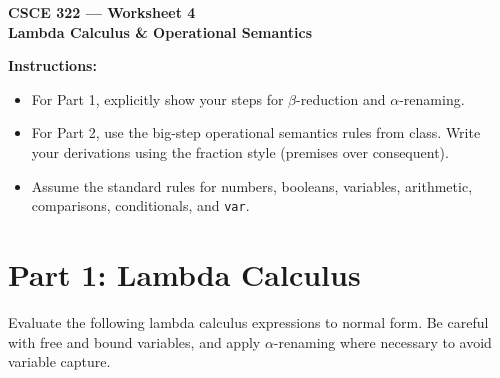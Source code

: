 \documentclass[11pt]{article}
\begin{document}
    \begin{center}
        \Large\textbf{CSCE 322 --- Worksheet 4}\\[2mm]
        \large\textbf{Lambda Calculus \& Operational Semantics}
    \end{center}

    \bigskip

    \noindent\textbf{Instructions:}
    \begin{itemize}
        \item For Part 1, explicitly show your steps for $\beta$-reduction and $\alpha$-renaming.
        \item For Part 2, use the big-step operational semantics rules from class. Write your derivations using the fraction style (premises over consequent).
        \item Assume the standard rules for numbers, booleans, variables, arithmetic, comparisons, conditionals, and \texttt{var}.
    \end{itemize}

    \newpage

    \section*{Part 1: Lambda Calculus}

    Evaluate the following lambda calculus expressions to normal form. Be careful with free and bound variables, and apply $\alpha$-renaming where necessary to avoid variable capture.
\end{document}
